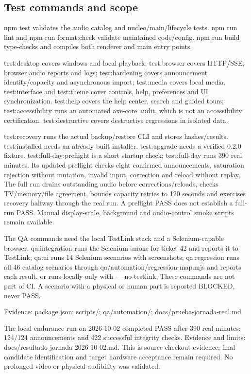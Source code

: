 \subsection{Test commands and scope}

npm test validates the audio catalog and nucleo/main/lifecycle tests. npm run lint and npm run format:check validate maintained code/config. npm run build type-checks and compiles both renderer and main entry points.

test:desktop covers windows and local playback; test:browser covers HTTP/SSE, browser audio reports and logs; test:hardening covers announcement identity/capacity and asynchronous import; test:media covers local media. test:interface and test:theme cover controls, help, preferences and UI synchronization. test:help covers the help center, search and guided tours; test:accessibility runs an automated axe-core audit, which is not an accessibility certification. test:destructive covers destructive regressions in isolated data.

test:recovery runs the actual backup/restore CLI and stores hashes/results. test:installed needs an already built installer. test:upgrade needs a verified 0.2.0 fixture. test:full-day:preflight is a short startup check; test:full-day runs 390 real minutes. Its updated preflight checks eight confirmed announcements, saturation rejection without mutation, invalid input, correction and reload without replay. The full run drains outstanding audio before corrections/reloads, checks TV/memory/file agreement, bounds capacity retries to 120 seconds and exercises recovery halfway through the real run. A preflight PASS does not establish a full-run PASS. Manual display-scale, background and audio-control smoke scripts remain available.

The QA commands need the local TestLink stack and a Selenium-capable browser. qa:integration runs the Selenium smoke for ticket 42 and reports it to TestLink; qa:ui runs 14 Selenium scenarios with screenshots; qa:regression runs all 46 catalog scenarios through qa/automation/regression-map.mjs and reports each result, or runs locally only with -- --no-testlink. These commands are not part of CI. A scenario with a physical or human part is reported BLOCKED, never PASS.

Evidence: package.json; scripts/; qa/automation/; docs/prueba-jornada-real.md

The local endurance run on 2026-10-02 completed PASS after 390 real minutes: 124/124 announcements and 422 successful integrity checks. Evidence and limits: docs/resultado-jornada-2026-10-02.md. This is source-checkout evidence; final candidate identification and target hardware acceptance remain required. No prolonged video or physical audibility was validated.
